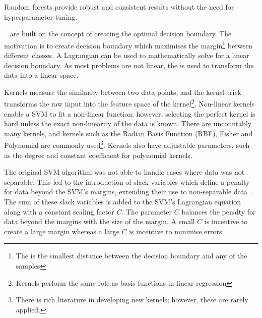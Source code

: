\documentclass[12pt, twoside]{book}
\renewcommand\emph[1]{\textit{\color{USred}{#1}}}
\begin{document}
\begin{highlight}
Random forests provide robust and consistent results without the need for hyperparameter tuning.
\end{highlight}

\emph{Support Vector Machines}~\cite{svm} are built on the concept of creating the optimal decision boundary. The motivation is to create decision boundary which maximises the margin\footnote{The \emph{margin} is the smallest distance between the decision boundary and any of the samples} between different classes. A Lagrangian can be used to mathematically solve for a linear decision boundary. As most problems are not linear, the \emph{kernel trick} is used to transform the data into a linear space.


Kernels measure the similarity between two data points, and the kernel trick transforms the raw input into the feature space of the kernel\footnote{Kernels perform the same role as basis functions in linear regression}. Non-linear kernels enable a SVM to fit a non-linear function; however, selecting the perfect kernel is hard unless the exact non-linearity of the data is known. There are uncountably many kernels, and kernels such as the Radian Basis Function (RBF), Fisher and Polynomial are commonly used\footnote{There is rich literature in developing new kernels; however, these are rarely applied.}. Kernels also have adjustable parameters, such as the degree and constant coefficient for polynomial kernels. 

The original SVM algorithm was not able to handle cases where data was not separable. This led to the introduction of slack variables which define a penalty for data beyond the SVM's margins, extending their use to non-separable data~\cite{cortes1995support}. The sum of these slack variables is added to the SVM's Lagrangian equation along with a constant scaling factor $C$. The parameter $C$ balances the penalty for data beyond the margins with the size of the margin. A small $C$ is incentive to create a large margin whereas a large $C$ is incentive to minimise errors.
\end{document}
